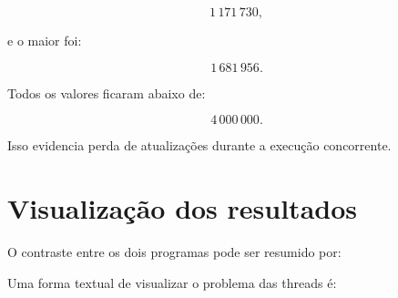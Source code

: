 \begin{equation}
    1\,171\,730,
\end{equation}

e o maior foi:

\begin{equation}
    1\,681\,956.
\end{equation}

Todos os valores ficaram abaixo de:

\begin{equation}
    4\,000\,000.
\end{equation}

Isso evidencia perda de atualizações durante a execução concorrente.

\section{Visualização dos resultados}
\label{sec:atvd03-visualizacao}

O contraste entre os dois programas pode ser resumido por:

\begin{center}
\end{center}

Uma forma textual de visualizar o problema das threads é:

